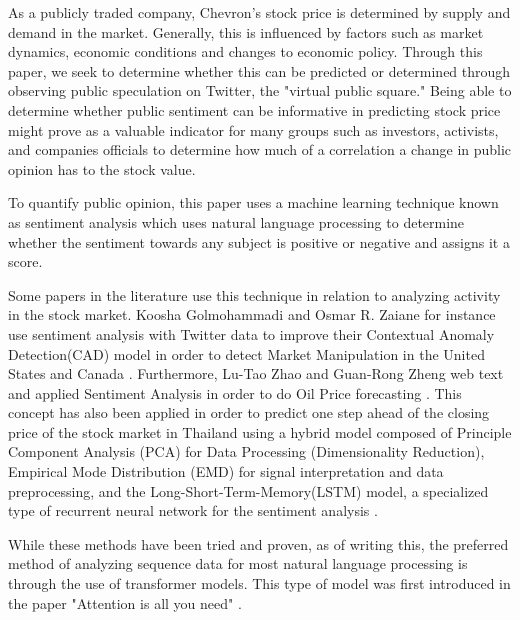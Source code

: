 \documentclass[12pt, letterpaper, titlepage]{article}
\begin{document}
As a publicly traded company, Chevron's stock price is determined by supply and demand in the market. Generally, this is influenced by factors such as market dynamics, economic conditions and changes to economic policy. Through this paper, we seek to determine whether this can be predicted or determined through observing public speculation on Twitter, the "virtual public square." Being able to determine whether public sentiment can be informative in predicting stock price might prove as a valuable indicator for many groups such as investors, activists, and companies officials to determine how much of a correlation a change in public opinion has to the stock value.  	

To quantify public opinion, this paper uses a machine learning technique known as sentiment analysis \citep{medhat2014sentiment} which uses natural language processing to determine whether the sentiment towards any subject is positive or negative and assigns it a score.

 Some papers in the literature use this technique in relation to analyzing activity in the stock market. Koosha Golmohammadi and Osmar R. Zaiane for instance use sentiment analysis with Twitter data to improve their Contextual Anomaly Detection(CAD) model in order to detect Market Manipulation in the United States and Canada \citep{golmohammadi2017sentiment}. Furthermore, Lu-Tao Zhao and Guan-Rong Zheng web text and applied Sentiment Analysis in order to do Oil Price forecasting \citep{zhao2019forecasting}. This concept has also been applied in order to predict one step ahead of the closing price of the stock market in Thailand using a hybrid model composed of Principle Component Analysis (PCA) for Data Processing (Dimensionality Reduction), Empirical Mode Distribution (EMD) for signal interpretation and data preprocessing, and the Long-Short-Term-Memory(LSTM) model, a specialized type of recurrent neural network for the sentiment analysis \citep{srijiranon2022hybrid}.

While these methods have been tried and proven, as of writing this, the preferred method of analyzing sequence data for most natural language processing is through the use of transformer models. This type of model was first introduced in the paper "Attention is all you need" \citep{vaswani2017attention}. 
\end{document}
